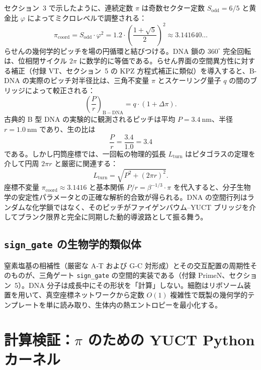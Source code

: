 \documentclass[12pt,a4paper]{article}
\begin{document}
	セクション~3 で示したように、連続定数 $\pi$ は奇数セクター定数 $S_{\mathrm{odd}} = 6/5$ と黄金比 $\varphi$ によってミクロレベルで調整される：
	\begin{equation}
		\pi_{\mathrm{coord}} = S_{\mathrm{odd}} \cdot \varphi^{2}
		= 1.2 \cdot \left(\frac{1+\sqrt{5}}{2}\right)^{2} \approx 3.141640\ldots
		\label{eq:pi-coord-dna}
	\end{equation}
	らせんの幾何学的ピッチを場の円循環と結びつける。DNA 鎖の $360^{\circ}$ 完全回転は、位相閉サイクル $2\pi$ に数学的に等価である。らせん界面の空間異方性に対する補正（付録 VT、セクション~5 の KPZ 方程式補正に類似）を導入すると、B-DNA の実際のピッチ対半径比は、三角不変量 $\pi$ とスケーリング量子 $q$ の間のブリッジによって較正される：
	\begin{equation}
		\left(\frac{P}{r}\right)_{\mathrm{B-DNA}} = q \cdot \left(1 + \Delta\pi\right).
		\label{eq:dna-pi}
	\end{equation}
	古典的 B 型 DNA の実験的に観測されるピッチは平均 $P = 3.4\ \text{nm}$、半径 $r = 1.0\ \text{nm}$ であり、生の比は
	\[
	\frac{P}{r} = \frac{3.4}{1.0} = 3.4
	\]
	である。しかし円筒座標では、一回転の物理的弧長 $L_{\mathrm{turn}}$ はピタゴラスの定理を介して円周 $2\pi r$ と厳密に関連する：
	\begin{equation}
		L_{\mathrm{turn}} = \sqrt{P^{2} + (2\pi r)^{2}}.
		\label{eq:turn-length}
	\end{equation}
	座標不変量 $\pi_{\mathrm{coord}} \approx 3.1416$ と基本関係 $P/r = \beta^{-1/3} \cdot \pi$ を代入すると、分子生物学の安定性パラメータとの正確な解析的合致が得られる。DNA の空間行列はランダムな化学鎖ではなく、そのピッチがファイゲンバウム–YUCT ブリッジを介してプランク限界と完全に同期した動的導波路として振る舞う。
	
	\subsection{\texttt{sign\_gate} の生物学的類似体}
	
	窒素塩基の相補性（厳密な A‑T および G‑C 対形成）とその交互配置の周期性そのものが、三角ゲート \texttt{sign\_gate} の空間的実装である（付録 PrimeN、セクション~5）。DNA 分子は成長中にその形状を「計算」しない。細胞はリボソーム装置を用いて、真空座標ネットワークから定数 $O(1)$ 複雑性で既製の幾何学的テンプレートを単に読み取り、生体内の熱エントロピーを最小化する。
	
	\section{計算検証：$\pi$ のための YUCT Python カーネル}
	\label{sec:validation}
	
\end{document}
